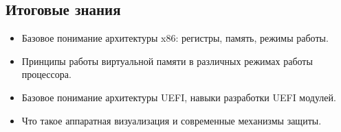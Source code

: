 \documentclass[english,russian,12pt]{article}
\begin{document}
\subsection*{Итоговые знания}
\begin{itemize}
  \item Базовое понимание архитектуры x86: регистры, память, режимы работы.
  \item Принципы работы виртуальной памяти в различных режимах работы процессора.
  \item Базовое понимание архитектуры UEFI, навыки разработки UEFI модулей.
  \item Что такое аппаратная визуализация и современные механизмы защиты.
\end{itemize}

\nocite{SDMVol1}
\nocite{SDMVol2}
\nocite{SDMVol3}
\nocite{SDMVol4}
\nocite{Optim}
\nocite{Fog}
\nocite{InstSet}
\nocite{Pentium}
\nocite{Guk8086}
\nocite{GukPen3}



\end{document}
